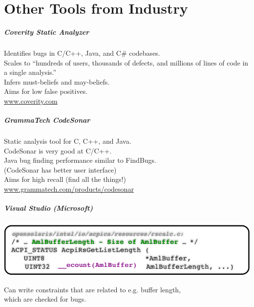 \documentclass{beamer}
\newenvironment{changemargin}[1]{%
  \begin{list}{}{%
    \setlength{\topsep}{0pt}%
    \setlength{\leftmargin}{#1}%
    \setlength{\rightmargin}{1em}
    \setlength{\listparindent}{\parindent}%
    \setlength{\itemindent}{\parindent}%
    \setlength{\parsep}{\parskip}%
  }%
  \item[]}{\end{list}}
\begin{document}
\part{Other Tools from Industry}
\frame{\partpage}

\begin{frame}
  \frametitle{Coverity Static Analyzer}
  \begin{changemargin}{2cm}
    Identifies bugs in C/C++, Java, and C\# codebases.\\[1em]
    Scales to ``hundreds of users, thousands of defects, and millions of lines of code in a single analysis.''\\[1em]
    Infers must-beliefs and may-beliefs.\\[1em]
    Aims for low false positives.\\[1em]
    \url{www.coverity.com}
  \end{changemargin}
\end{frame}

\begin{frame}
  \frametitle{GrammaTech CodeSonar}
  \begin{changemargin}{2cm}
    Static analysis tool for C, C++, and Java.\\[1em]
    CodeSonar is very good at C/C++.\\[1em]
    Java bug finding performance similar to FindBugs.\\
    (CodeSonar has better user interface)\\[1em]
    Aims for high recall (find all the things!)\\[1em]
    \url{www.grammatech.com/products/codesonar}
  \end{changemargin}
\end{frame}

\begin{frame}
  \frametitle{Visual Studio (Microsoft)}

  \begin{center}
    \includegraphics[width=.8\textwidth]{L11/visualstudio-sal}
  \end{center}

  \begin{changemargin}{1cm}
    Can write constraints that are related to e.g. buffer length, \\
    which are checked for bugs.
  \end{changemargin}
\end{frame}
\end{document}
